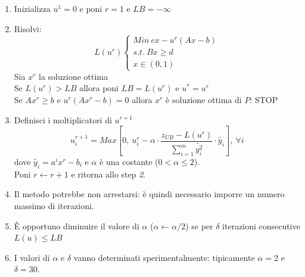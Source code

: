 \begin{enumerate}
	\item Inizializza $u^{1}=0$ e poni $r=1$ e $LB=-\infty$
	\item Risolvi:
	\begin{equation*}
		L(u^{r})
		\begin{cases}
			Min\ cx-u^{r}(Ax-b)\\
			s.t.\ Bx\ge d\\
			x\in(0,1)
		\end{cases}
	\end{equation*}
	Sia $x^{r}$ la soluzione ottima\\
	Se $L(u^{r})>LB$ allora poni $LB=L(u^{r})$ e $u^{*}=u^{r}$\\
	Se $Ax^{r}\ge b$ e $u^{r}(Ax^{r}-b)=0$ allora $x^{r}$ è soluzione ottima di $P$: STOP
	\item Definisci i moltiplicatori di $u^{r+1}$
	\begin{equation*}
		u_{i}^{r+1}=Max[0,\ u_{i}^{r}-\alpha \cdot\frac{z_{UB}-L(u^{r})}{\sum_{i=1}^{m}\widetilde{y_{i}^{2}}}\cdot\widetilde{y_{i}}],\ \forall i
	\end{equation*}
	dove $\widetilde{y_{i}}=a^{i}x^{r}-b_{i}$ e $\alpha$ è una costante ($0<\alpha\le 2$).\\
	Poni $r\gets r+1$ e ritorna allo step \textit{2}.
	\item Il metodo potrebbe non arrestarsi: è quindi necessario imporre un numero massimo di iterazioni.
	\item È opportuno diminuire il valore di $\alpha$ ($\alpha\gets\alpha/2$) se per $\delta$ iterazioni consecutive $L(u)\le LB$
	\item I valori di $\alpha$ e $\delta$ vanno determinati sperimentalmente: tipicamente $\alpha=2$ e $\delta=30$.
\end{enumerate}

